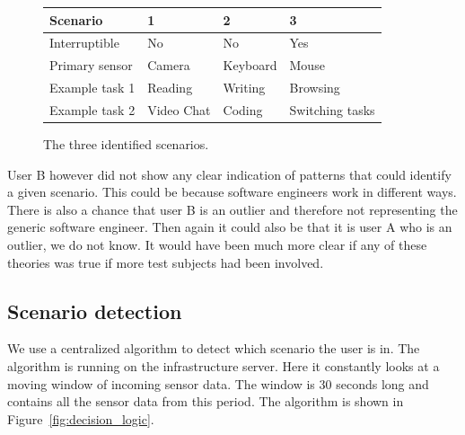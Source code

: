 \documentclass{sigchi}
\begin{document}
\begin{figure}[H]
  \centering
      \begin{tabular}{@{}llll@{}}
      \toprule
      \textbf{Scenario} & \textbf{1} & \textbf{2} & \textbf{3}      \\ \midrule
      Interruptible     & No         & No         & Yes             \\
      Primary sensor    & Camera     & Keyboard   & Mouse           \\
      Example task 1    & Reading    & Writing    & Browsing        \\
      Example task 2    & Video Chat & Coding     & Switching tasks \\ \bottomrule
      \end{tabular}
  \caption{The three identified scenarios.}
  \label{fig:scenarios}
\end{figure}

User B however did not show any clear indication of patterns that could identify a given scenario.
This could be because software engineers work in different ways.
There is also a chance that user B is an outlier and therefore not representing the generic software engineer.
Then again it could also be that it is user A who is an outlier, we do not know.
It would have been much more clear if any of these theories was true if more test subjects had been involved.

\subsection{Scenario detection}
We use a centralized algorithm to detect which scenario the user is in.
The algorithm is running on the infrastructure server.
Here it constantly looks at a moving window of incoming sensor data.
The window is 30 seconds long and contains all the sensor data from this period.
The algorithm is shown in Figure~\ref{fig:decision_logic}.
\end{document}
